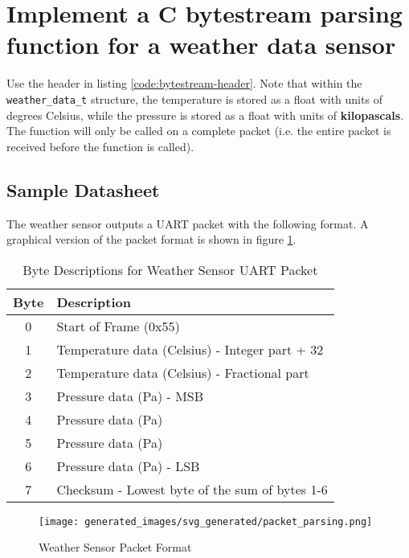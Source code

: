\documentclass[main.tex]{subfiles}
\begin{document}
\section{Implement a C bytestream parsing function for a weather data sensor}
Use the header in listing \ref{code:bytestream-header}. Note that within the \texttt{weather\_data\_t} structure, the temperature is stored as a float with units of degrees Celsius, while the pressure is stored as a float with units of \textbf{kilopascals}. The function will only be called on a complete packet (i.e. the entire packet is received before the function is called).



\subsection{Sample Datasheet}
The weather sensor outputs a UART packet with the following format. A graphical version of the packet format is shown in figure \ref{fig:packet-data}.
\begin{table}[h!]
    \centering
    \begin{tabular}{|c|l|}
    \hline
    \textbf{Byte} & \textbf{Description} \\ \hline
    0 & Start of Frame (0x55) \\ \hline
    1 & Temperature data (Celsius) - Integer part + 32 \\ \hline
    2 & Temperature data (Celsius) - Fractional part \\ \hline
    3 & Pressure data (Pa) - MSB \\ \hline
    4 & Pressure data (Pa) \\ \hline
    5 & Pressure data (Pa) \\ \hline
    6 & Pressure data (Pa) - LSB \\ \hline
    7 & Checksum - Lowest byte of the sum of bytes 1-6 \\ \hline
    \end{tabular}
    \caption{Byte Descriptions for Weather Sensor UART Packet}
    \label{table:byte_description}
\end{table}
    

\begin{figure}[H]
    \centering
    \texttt{[image: generated\_images/svg\_generated/packet\_parsing.png]}
    \caption{Weather Sensor Packet Format}
    \label{fig:packet-data}
\end{figure}
\end{document}
